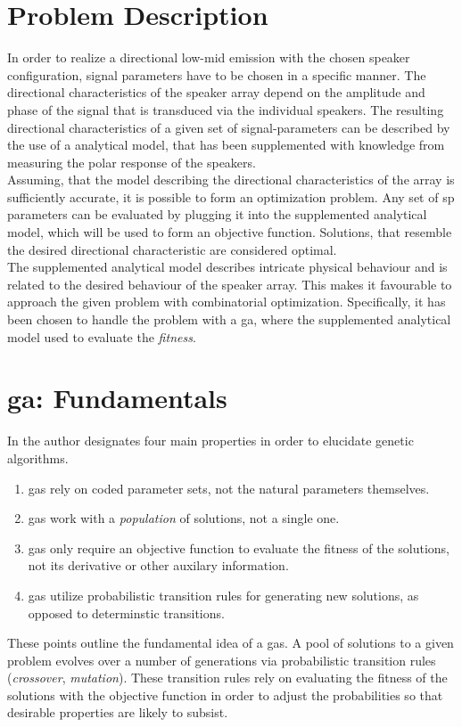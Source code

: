 \section{Problem Description}
In order to realize a directional low-mid emission with the chosen speaker configuration, signal parameters have to be chosen in a specific manner. The directional characteristics of the speaker array depend on the amplitude and phase of the signal that is transduced via the individual speakers. The resulting directional characteristics of a given set of signal-parameters can be described by the use of a analytical model, that has been supplemented with knowledge from measuring the polar response of the speakers.\\
Assuming, that the model describing the directional characteristics of the array is sufficiently accurate, it is possible to form an optimization problem. Any set of \gls{sp} parameters can be evaluated by plugging it into the supplemented analytical model, which will be used to form an objective function. Solutions, that resemble the desired directional characteristic are considered optimal.\\
The supplemented analytical model describes intricate physical behaviour and is related to the desired behaviour of the speaker array.  This makes it favourable to approach the given problem with combinatorial optimization. Specifically, it has been chosen to handle the problem with a \gls{ga}, where the supplemented analytical model used to evaluate the \textit{fitness}.


\section{\gls{ga}: Fundamentals}\label{sec:ga_fundamental}
In \citep[p. 7]{goldberg89} the author designates four main properties in order to elucidate genetic algorithms. 
\begin{enumerate}
\item \gls{ga}s rely on coded parameter sets, not the natural parameters themselves.
\item \gls{ga}s work with a \textit{population} of solutions, not a single one.
\item \gls{ga}s only require an objective function to evaluate the fitness of the solutions, not its derivative or other auxilary information.
\item \gls{ga}s utilize probabilistic transition rules for generating new solutions, as opposed to determinstic transitions.
\end{enumerate}
These points outline the fundamental idea of a \gls{ga}s. A pool of solutions to a given problem evolves over a number of generations via probabilistic transition rules (\textit{crossover}, \textit{mutation}).
These transition rules rely on evaluating the fitness of the solutions with the objective function in order to adjust the probabilities so that desirable properties are likely to subsist.
\citep{genetic_survey}

